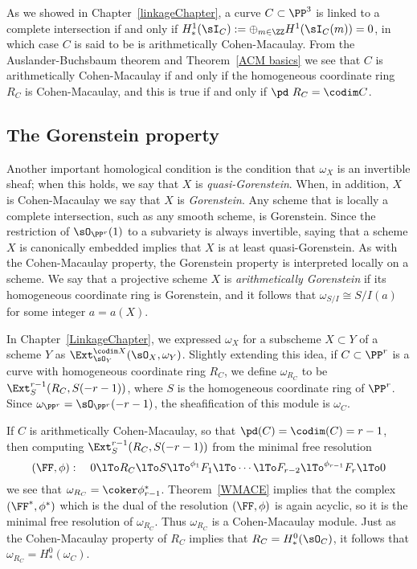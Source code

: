 As we showed in Chapter~\ref{linkageChapter}, a curve $C\subset \PP^3$ is linked to a complete intersection
if and only if  $H^1_*(\sI_C) := \oplus_{m\in \ZZ} H^1(\sI_C(m)) = 0$, in which case $C$ is said to be is arithmetically Cohen-Macaulay.
From the Auslander-Buchsbaum theorem and Theorem~\ref{ACM basics} we see that $C$ is arithmetically Cohen-Macaulay if
and only if the homogeneous coordinate ring $R_C$ is Cohen-Macaulay, and this is true
if and only if $\pd\  R_C = \codim C$.


\subsection{The Gorenstein property} 
Another important homological condition is the condition that $\omega_X$ is an invertible sheaf; when this holds, we say that $X$ is \emph{quasi-Gorenstein}. When, in addition, $X$ is Cohen-Macaulay we say that $X$ is \emph{Gorenstein}. Any scheme that is locally a complete intersection, such as any smooth scheme, is Gorenstein. Since the restriction
of $\sO_{\PP^r}(1)$ to a subvariety is always invertible, saying that a scheme $X$ is canonically embedded implies that
$X$ is at least quasi-Gorenstein. As with the Cohen-Macaulay property, the Gorenstein property is interpreted locally
on a scheme. We say that a projective scheme $X$ is \emph{arithmetically Gorenstein}
if its homogeneous coordinate ring is Gorenstein, and it follows that $\omega_{S/I} \cong S/I(a)$ for some integer $a = a(X)$.

In Chapter~\ref{LinkageChapter},  we expressed $\omega_X$
for a subscheme $X\subset Y$ of a scheme $Y$ as
 $\Ext^{\codim X}_{\sO_Y}(\sO_X, \omega_Y)$. Slightly extending this idea, if $C\subset \PP^r$ is a curve
with homogeneous coordinate ring $R_{C}$,
 we define $\omega_{R_C}$ to be $\Ext^{r-1}_S(R_C, S(-r-1))$, where $S$ is the homogeneous coordinate ring of $\PP^r$.
Since $\omega_{\PP^r} = \sO_{\PP^r}(-r-1)$, the sheafification of this module is  $\omega_C$.

If $C$ is arithmetically Cohen-Macaulay, so that
$\pd (C) = \codim(C) = r-1$,  then 
computing $\Ext^{r-1}_S(R_C, S(-r-1))$ from the minimal free resolution 
$$
(\FF, \phi):\quad 0\lTo R_C \lTo S\lTo^{\phi_1} F_1 \lTo \cdots \lTo F_{r-2} \lTo^{\phi_{r-1}} F_r\lTo 0
$$
we see that $\omega_{R_C} = \coker \phi_{r-1}^*$. Theorem~\ref{WMACE} implies that the complex $(\FF^*, \phi^*)$ which is the dual
of the  resolution $(\FF, \phi)$ is again acyclic, so it is the minimal free resolution of $\omega_{R_C}$. Thus 
$\omega_{R_C}$ is a Cohen-Macaulay module. Just as the Cohen-Macaulay property of
$R_C$ implies that $R_C = H^0_*(\sO_C)$, it follows that $\omega_{R_C} = H^0_*(\omega_C)$.

